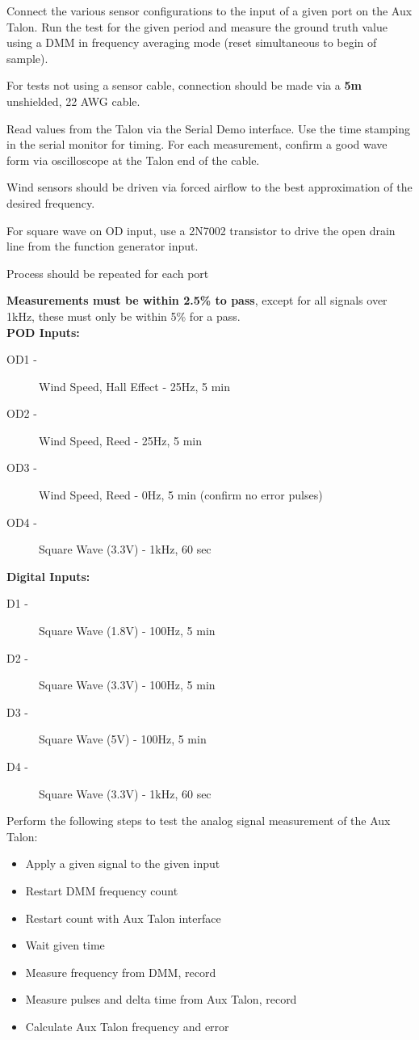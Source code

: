 Connect the various sensor configurations to the input of a given port on the Aux Talon. Run the test for the given period and measure the ground truth value using a DMM in frequency averaging mode (reset simultaneous to begin of sample). 

For tests not using a sensor cable, connection should be made via a \textbf{5m} unshielded, 22 AWG cable.


Read values from the Talon via the Serial Demo interface. Use the time stamping in the serial monitor for timing. For each measurement, confirm a good wave form via oscilloscope at the Talon end of the cable.

Wind sensors should be driven via forced airflow to the best approximation of the desired frequency. 

For square wave on OD input, use a 2N7002 transistor to drive the open drain line from the function generator input. 

Process should be repeated for each port 

\textbf{Measurements must be within 2.5\% to pass}, except for all signals over 1kHz, these must only be within 5\% for a pass. \\

{\large \textbf{POD Inputs:}}
\begin{description}
\item [OD1 -] Wind Speed, Hall Effect - 25Hz, 5 min
\item [OD2 -]  Wind Speed, Reed - 25Hz, 5 min
\item [OD3 -] Wind Speed, Reed - 0Hz, 5 min (confirm no error pulses)
\item [OD4 -] Square Wave (3.3V) - 1kHz, 60 sec
\end{description}

{\large \textbf{Digital Inputs:}}
\begin{description}
\item [D1 -] Square Wave (1.8V) - 100Hz, 5 min
\item [D2 -] Square Wave (3.3V) - 100Hz, 5 min
\item [D3 -] Square Wave (5V) - 100Hz, 5 min
\item [D4 -] Square Wave (3.3V) - 1kHz, 60 sec
\end{description}

Perform the following steps to test the analog signal measurement of the Aux Talon:
\begin{itemize}
\item Apply a given signal to the given input
\item Restart DMM frequency count
\item Restart count with Aux Talon interface
\item Wait given time
\item Measure frequency from DMM, record 
\item Measure pulses and delta time from Aux Talon, record
\item Calculate Aux Talon frequency and error

\end{itemize}

